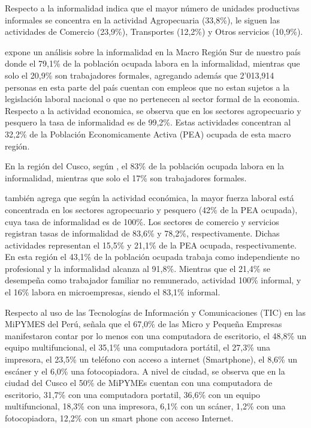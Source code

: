 Respecto a la informalidad \cite{inei2} indica que el mayor número de unidades
productivas informales se concentra en la actividad Agropecuaria (33,8\%), le
siguen las actividades de Comercio (23,9\%), Transportes (12,2\%) y Otros servicios (10,9\%).

\cite{perucamaras} expone un análisis sobre la informalidad en la Macro Región
Sur de nuestro país donde el 79,1\% de la población ocupada labora en la informalidad,
mientras que solo el 20,9\% son trabajadores formales, agregando además que
2'013,914 personas en esta parte del país cuentan con empleos que no estan sujetos
a la legislación laboral nacional o que no pertenecen al sector formal de la
economia. Respecto a la actividad economica, se observa que en los sectores agropecuario
y pesquero la tasa de informalidad es de 99,2\%. Estas actividades concentran al
32,2\% de la Población Economicamente Activa (PEA) ocupada de esta macro región.

En la región del Cusco, según \cite{perucamaras}, el 83\% de la población
ocupada labora en la informalidad, mientras que solo el 17\% son trabajadores formales.

\cite{perucamaras} también agrega que según la actividad económica, la mayor
fuerza laboral está concentrada en los sectores agropecuario y pesquero (42\% de
la PEA ocupada), cuya tasa de informalidad es de 100\%. Los sectores de comercio
y servicios registran tasas de informalidad de 83,6\% y 78,2\%, respectivamente.
Dichas actividades representan el 15,5\% y 21,1\% de la PEA ocupada, respectivamente.
En esta región el 43,1\% de la población ocupada trabaja como independiente no
profesional y la informalidad alcanza al 91,8\%. Mientras que el 21,4\% se desempeña
como trabajador familiar no remunerado, actividad 100\% informal, y el 16\% labora en
microempresas, siendo el 83,1\% informal.

Respecto al uso de las Tecnologías de Información y Comunicaciones (TIC) en las
MiPYMES del Perú, \cite{inei1} señala que el 67,0\% de las Micro y Pequeña Empresas
manifestaron contar por lo menos con una computadora de escritorio, el 48,8\% un
equipo multifuncional, el 35,1\% una computadora portátil, el 27,3\% una impresora,
el 23,5\% un teléfono con acceso a internet (Smartphone), el 8,6\% un escáner y
el 6,0\% una fotocopiadora. A  nivel  de  ciudad,  se  observa  que  en la ciudad
del Cusco el 50\% de MiPYMEs cuentan con una computadora de escritorio, 31,7\% con
una computadora portatil, 36,6\% con un equipo multifuncional, 18,3\% con una impresora,
6,1\% con un scáner, 1,2\% con una fotocopiadora, 12,2\% con un smart phone con acceso
Internet.

